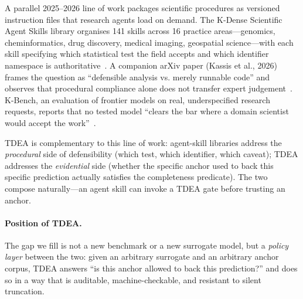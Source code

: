 \documentclass[review,3p]{elsarticle}
\begin{document}
A parallel 2025--2026 line of work packages scientific procedures as versioned instruction files that research agents load on demand. The K-Dense Scientific Agent Skills library organises 141 skills across 16 practice areas---genomics, cheminformatics, drug discovery, medical imaging, geospatial science---with each skill specifying which statistical test the field accepts and which identifier namespace is authoritative~\cite{kassis2026scientificagentskills}. A companion arXiv paper (Kassis et al., 2026) frames the question as ``defensible analysis vs. merely runnable code'' and observes that procedural compliance alone does not transfer expert judgement~\cite{kassis2026mimeo}. K-Bench, an evaluation of frontier models on real, underspecified research requests, reports that no tested model ``clears the bar where a domain scientist would accept the work''~\cite{brueckner2026kbench}.

TDEA is complementary to this line of work: agent-skill libraries address the \emph{procedural} side of defensibility (which test, which identifier, which caveat); TDEA addresses the \emph{evidential} side (whether the specific anchor used to back this specific prediction actually satisfies the completeness predicate). The two compose naturally---an agent skill can invoke a TDEA gate before trusting an anchor.

\paragraph{Position of TDEA.}
The gap we fill is not a new benchmark or a new surrogate model, but a \emph{policy layer} between the two: given an arbitrary surrogate and an arbitrary anchor corpus, TDEA answers ``is this anchor allowed to back this prediction?'' and does so in a way that is auditable, machine-checkable, and resistant to silent truncation.


\end{document}
